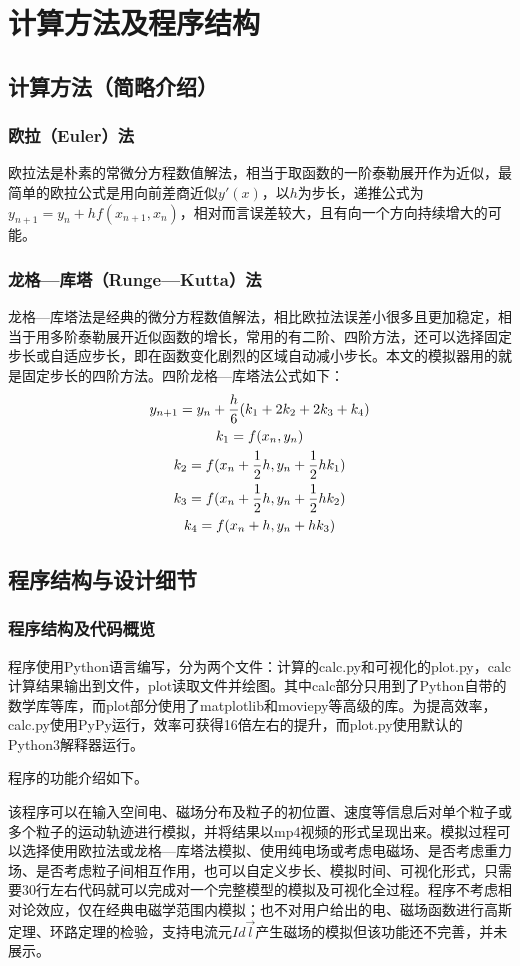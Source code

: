 \documentclass[UTF-8,cs4size]{ctexart}
\begin{document}
\section{计算方法及程序结构}
\subsection{计算方法（简略介绍）}
\subsubsection{欧拉（Euler）法}
欧拉法是朴素的常微分方程数值解法，相当于取函数的一阶泰勒展开作为近似，最简单的欧拉公式是用向前差商近似$y'(x)$，以$h$为步长，递推公式为$y_{n+1} = y_n + hf(x_{n+1},x_{n})$，相对而言误差较大，且有向一个方向持续增大的可能。
\subsubsection{龙格—库塔（Runge—Kutta）法}
龙格—库塔法是经典的微分方程数值解法，相比欧拉法误差小很多且更加稳定，相当于用多阶泰勒展开近似函数的增长，常用的有二阶、四阶方法，还可以选择固定步长或自适应步长，即在函数变化剧烈的区域自动减小步长。本文的模拟器用的就是固定步长的四阶方法。四阶龙格—库塔法公式如下：
\begin{gather}
	y_{n+1} = y_n + \frac{h}{6}(k_1+2k_2+2k_3+k_4) \notag \\
	k_1 = f(x_n,y_n) \notag \\
	k_2 = f(x_n+\frac12h,y_n+\frac12hk_1) \notag \\
	k_3 = f(x_n+\frac12h,y_n+\frac12hk_2) \notag \\
	k_4 = f(x_n+h,y_n+hk_3)
\end{gather}
\subsection{程序结构与设计细节}
\subsubsection{程序结构及代码概览}
程序使用Python语言编写，分为两个文件：计算的calc.py和可视化的plot.py，calc计算结果输出到文件，plot读取文件并绘图。其中calc部分只用到了Python自带的数学库等库，而plot部分使用了matplotlib和moviepy等高级的库。为提高效率，calc.py使用PyPy运行，效率可获得16倍左右的提升，而plot.py使用默认的Python3解释器运行。


程序的功能介绍如下。


该程序可以在输入空间电、磁场分布及粒子的初位置、速度等信息后对单个粒子或多个粒子的运动轨迹进行模拟，并将结果以mp4视频的形式呈现出来。模拟过程可以选择使用欧拉法或龙格—库塔法模拟、使用纯电场或考虑电磁场、是否考虑重力场、是否考虑粒子间相互作用，也可以自定义步长、模拟时间、可视化形式，只需要30行左右代码就可以完成对一个完整模型的模拟及可视化全过程。程序不考虑相对论效应，仅在经典电磁学范围内模拟；也不对用户给出的电、磁场函数进行高斯定理、环路定理的检验，支持电流元$Id\vec{l}$产生磁场的模拟但该功能还不完善，并未展示。
\end{document}
